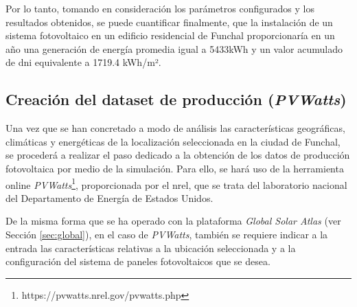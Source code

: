 Por lo tanto, tomando en consideración los parámetros configurados y los resultados obtenidos, se puede cuantificar finalmente, que la instalación de un sistema fotovoltaico en un edificio residencial de Funchal proporcionaría en un año una generación de energía promedia igual a 5433kWh y un valor acumulado de \gls{dni} equivalente a 1719.4 kWh/m².

\vspace{3mm}







\subsection{Creación del dataset de producción (\textit{PVWatts})}
\label{sec:pvw}

Una vez que se han concretado a modo de análisis las características geográficas, climáticas y energéticas de la localización seleccionada en la ciudad de Funchal, se procederá a realizar el paso dedicado a la obtención de los datos de producción fotovoltaica por medio de la simulación. Para ello, se hará uso de la herramienta online \textit{PVWatts}\footnote{https://pvwatts.nrel.gov/pvwatts.php}, proporcionada por el \gls{nrel}, que se trata del laboratorio nacional del Departamento de Energía de Estados Unidos. \cite{pvwatts}

\vspace{3mm}

De la misma forma que se ha operado con la plataforma \textit{Global Solar Atlas} (ver Sección \ref{sec:global}), en el caso de \textit{PVWatts}, también se requiere indicar a la entrada las características relativas a la ubicación seleccionada y a la configuración del sistema de paneles fotovoltaicos que se desea. 

